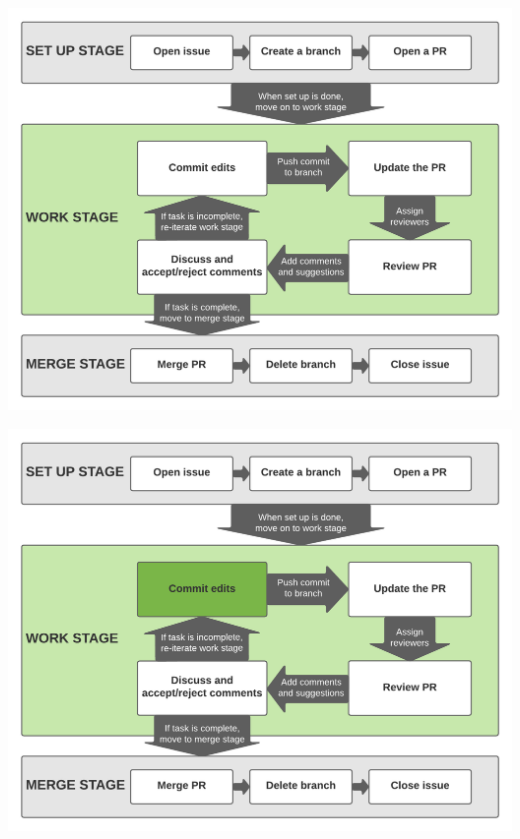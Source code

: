 \documentclass[aspectratio=169]{beamer} %
\begin{document}
\begin{frame}
	\includegraphics[width=\textwidth]{./img/branch-pr-merge-cycle-S2.png}
\end{frame}

\begin{frame}
	\includegraphics[width=\textwidth]{./img/branch-pr-merge-cycle-S2-1.png}
\end{frame}
\end{document}
